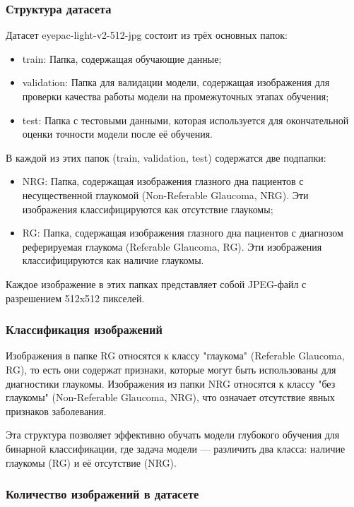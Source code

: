{    \subsubsection*{Структура датасета}

    Датасет eyepac-light-v2-512-jpg состоит из трёх основных папок:
    \begin{itemize}
        \item train: Папка, содержащая обучающие данные;
        \item validation: Папка для валидации модели, содержащая изображения для проверки качества работы модели на промежуточных этапах обучения;
        \item test: Папка с тестовыми данными, которая используется для окончательной оценки точности модели после её обучения.
    \end{itemize}

    В каждой из этих папок (train, validation, test) содержатся две подпапки:
    \begin{itemize}
        \item NRG: Папка, содержащая изображения глазного дна пациентов с несущественной глаукомой (Non-Referable Glaucoma, NRG). Эти изображения классифицируются как отсутствие глаукомы;
        \item RG: Папка, содержащая изображения глазного дна пациентов с диагнозом реферируемая глаукома (Referable Glaucoma, RG). Эти изображения классифицируются как наличие глаукомы.
    \end{itemize}

    Каждое изображение в этих папках представляет собой JPEG-файл с разрешением 512x512 пикселей. 
    \subsubsection*{Классификация изображений}

    Изображения в папке RG относятся к классу "глаукома" (Referable  Glaucoma, RG), то есть они содержат признаки, которые могут быть использованы для диагностики глаукомы. Изображения из папки NRG относятся к классу "без глаукомы" (Non-Referable Glaucoma, NRG), что означает отсутствие явных признаков заболевания.

    Эта структура позволяет эффективно обучать модели глубокого обучения для бинарной классификации, где задача модели — различить два класса: наличие глаукомы (RG) и её отсутствие (NRG).

    \subsubsection*{Количество изображений в датасете}

}
